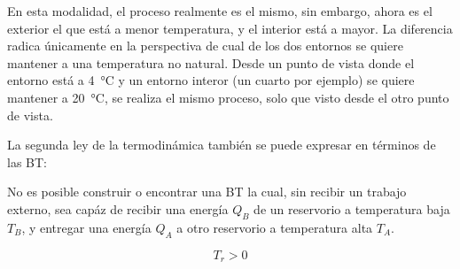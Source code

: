 \begin{enumerate}
        En esta modalidad, el proceso realmente es el mismo, sin embargo, ahora
        es el exterior el que está a menor temperatura, y el interior está a mayor.
        La diferencia radica únicamente en la perspectiva de cual de los dos entornos
        se quiere mantener a una temperatura no natural. Desde un punto de vista donde
        el entorno está a \qty{4}{\degreeCelsius} y un entorno interor (un cuarto por
        ejemplo) se quiere mantener a \qty{20}{\degreeCelsius}, se realiza el mismo
        proceso, solo que visto desde el otro punto de vista.
\end{enumerate}

La segunda ley de la termodinámica también se puede expresar en términos
de las BT:

No es posible construir o encontrar una BT la cual, sin recibir un trabajo
externo, sea capáz de recibir una energía $Q_B$ de un reservorio a
temperatura baja $T_B$, y entregar una energía $Q_A$ a otro reservorio
a temperatura alta $T_A$.

\[T_r > 0\]
